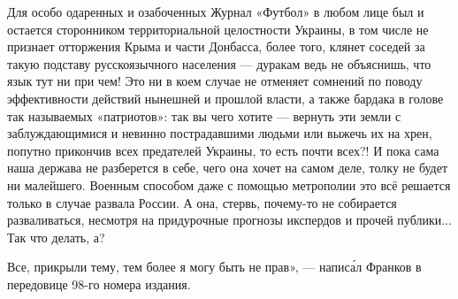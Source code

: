 Для особо одаренных и озабоченных Журнал «Футбол» в любом лице был и остается
сторонником территориальной целостности Украины, в том числе не признает
отторжения Крыма и части Донбасса, более того, клянет соседей за такую подставу
русскоязычного населения — дуракам ведь не объяснишь, что язык тут ни при чем!
Это ни в коем случае не отменяет сомнений по поводу эффективности действий
нынешней и прошлой власти, а также бардака в голове так называемых «патриотов»:
так вы чего хотите — вернуть эти земли с заблуждающимися и невинно
пострадавшими людьми или выжечь их на хрен, попутно прикончив всех предателей
Украины, то есть почти всех?! И пока сама наша держава не разберется в себе,
чего она хочет на самом деле, толку не будет ни малейшего. Военным способом
даже с помощью метрополии это всё решается только в случае развала России. А
она, стервь, почему-то не собирается разваливаться, несмотря на придурочные
прогнозы икспердов и прочей публики... Так что делать, а?

Все, прикрыли тему, тем более я могу быть не прав», — написа́л Франков в
передовице 98-го номера издания.
